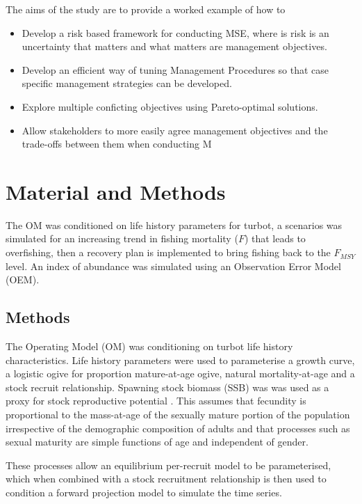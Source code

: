 \documentclass[12pt,doublespacing,a4paper]{ouparticle}
\begin{document}
The aims of the study are to provide a worked example of how to
 \begin{itemize}
  \item  Develop a risk based framework for conducting MSE,  where is risk is an uncertainty that matters and what matters are management objectives.
  \item  Develop an efficient way of tuning Management Procedures so that case specific management strategies can be developed.
  \item  Explore multiple conficting objectives using Pareto-optimal solutions.
  \item  Allow stakeholders to more easily agree management objectives and the trade-offs between them when conducting M
 \end{itemize}


\section{Material and Methods}

The OM was conditioned on life history parameters for turbot, a scenarios was simulated for an increasing trend in fishing mortality ($F$) that leads to overfishing, then a recovery plan is implemented to bring fishing back to the $F_{MSY}$ level. An index of abundance was simulated using an Observation Error Model (OEM).


\subsection{Methods}

The  Operating Model (OM) was conditioning on turbot life history characteristics.  Life history parameters were used to parameterise a \cite{vonbert1957quantitative} growth curve, a logistic ogive for proportion mature-at-age ogive, natural mortality-at-age \citep{lorenzen2002density} and a \cite{beverton1993dynamics} stock recruit relationship. Spawning stock biomass (SSB) was was used as a proxy for stock reproductive potential \citep[SRP][]{trippel_estimation_1999,Trippel 1999,tomkiewicz2003avaliable}. This assumes that fecundity is proportional to the mass-at-age of the sexually mature portion of the population irrespective of the demographic composition of adults \citep{murawski_impacts_2001} and that processes such as sexual maturity are simple functions of age \citep{matsuda_inconsistency_1996} and independent of gender.

These processes allow an equilibrium per-recruit model to be parameterised, which when combined with a stock recruitment relationship \cite{sissenwine1987alternative} is then used to condition a forward projection model to simulate the time series.
\end{document}
